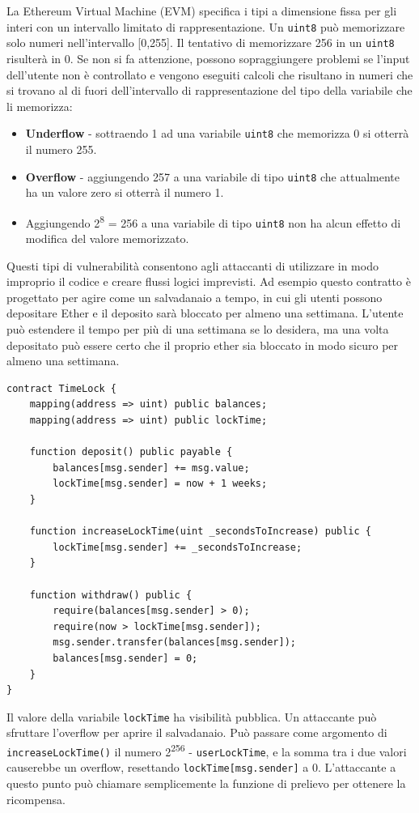 La Ethereum Virtual Machine (EVM) specifica i tipi a dimensione fissa per gli interi con un intervallo limitato di rappresentazione. Un \texttt{uint8} può memorizzare solo numeri nell'intervallo [0,255]. Il tentativo di memorizzare 256 in un \texttt{uint8} risulterà in 0. Se non si fa attenzione, possono sopraggiungere problemi se l'input dell'utente non è controllato e vengono eseguiti calcoli che risultano in numeri che si trovano al di fuori dell'intervallo di rappresentazione del tipo della variabile che li memorizza:
\begin{itemize}
    \item \textbf{Underflow} - sottraendo 1 ad una variabile \texttt{uint8} che memorizza 0 si otterrà il numero 255.
    \item \textbf{Overflow} - aggiungendo 257 a una variabile di tipo \texttt{uint8} che attualmente ha un valore zero si otterrà il numero 1.
    \item Aggiungendo 2\textsuperscript{8} = 256 a una variabile di tipo \texttt{uint8} non ha alcun effetto di modifica del valore memorizzato.
\end{itemize}
Questi tipi di vulnerabilità consentono agli attaccanti di utilizzare in modo improprio il codice e creare flussi logici imprevisti. Ad esempio questo contratto è progettato per agire come un salvadanaio a tempo, in cui gli utenti possono depositare Ether e il deposito sarà bloccato per almeno una settimana. L'utente può estendere il tempo per più di una settimana se lo desidera, ma una volta depositato può essere certo che il proprio ether sia bloccato in modo sicuro per almeno una settimana.

\begin{lstlisting}[language=Solidity]
contract TimeLock {
    mapping(address => uint) public balances;
    mapping(address => uint) public lockTime;
    
    function deposit() public payable {
        balances[msg.sender] += msg.value;
        lockTime[msg.sender] = now + 1 weeks;
    }
    
    function increaseLockTime(uint _secondsToIncrease) public {
        lockTime[msg.sender] += _secondsToIncrease;
    }
    
    function withdraw() public {
        require(balances[msg.sender] > 0);
        require(now > lockTime[msg.sender]);
        msg.sender.transfer(balances[msg.sender]);
        balances[msg.sender] = 0;
    }
}
\end{lstlisting}
Il valore della variabile \texttt{lockTime} ha visibilità pubblica. Un attaccante può sfruttare l'overflow per aprire il salvadanaio. Può passare come argomento di \texttt{increaseLockTime()} il numero 2\textsuperscript{256} - \texttt{userLockTime}, e la somma tra i due valori causerebbe un overflow, resettando \texttt{lockTime[msg.sender]} a 0. L'attaccante a questo punto può chiamare semplicemente la funzione di prelievo per ottenere la ricompensa.

